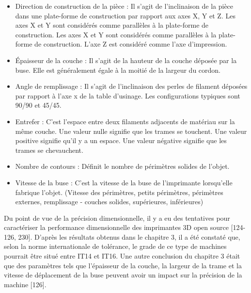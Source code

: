 \documentclass[
]{article}
\providecommand{\tightlist}{%
  \setlength{\itemsep}{0pt}\setlength{\parskip}{0pt}}
\begin{document}
\begin{itemize}
\tightlist
\item
  Direction de construction de la pièce : Il s'agit de l'inclinaison de
  la pièce dans une plate-forme de construction par rapport aux axes X,
  Y et Z. Les axes X et Y sont considérés comme parallèles à la
  plate-forme de construction. Les axes X et Y sont considérés comme
  parallèles à la plate-forme de construction. L'axe Z est considéré
  comme l'axe d'impression.
\item
  Épaisseur de la couche : Il s'agit de la hauteur de la couche déposée
  par la buse. Elle est généralement égale à la moitié de la largeur du
  cordon.
\item
  Angle de remplissage : Il s'agit de l'inclinaison des perles de
  filament déposées par rapport à l'axe x de la table d'usinage. Les
  configurations typiques sont 90/90 et 45/45.
\item
  Entrefer : C'est l'espace entre deux filaments adjacents de matériau
  sur la même couche. Une valeur nulle signifie que les trames se
  touchent. Une valeur positive signifie qu'il y a un espace. Une valeur
  négative signifie que les trames se chevauchent.
\item
  Nombre de contours : Définit le nombre de périmètres solides de
  l'objet.
\item
  Vitesse de la buse : C'est la vitesse de la buse de l'imprimante
  lorsqu'elle fabrique l'objet. (Vitesse des périmètres, petits
  périmètres, périmètres externes, remplissage - couches solides,
  supérieures, inférieures)
\end{itemize}

Du point de vue de la précision dimensionnelle, il y a eu des tentatives
pour caractériser la performance dimensionnelle des imprimantes 3D open
source {[}124-126, 230{]}. D'après les résultats obtenus dans le
chapitre 3, il a été constaté que, selon la norme internationale de
tolérance, le grade de ce type de machines pourrait être situé entre
IT14 et IT16. Une autre conclusion du chapitre 3 était que des
paramètres tels que l'épaisseur de la couche, la largeur de la trame et
la vitesse de déplacement de la buse peuvent avoir un impact sur la
précision de la machine {[}126{]}.
\end{document}
